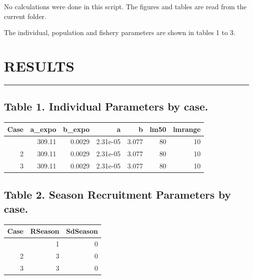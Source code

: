 \documentclass[
]{article}
\begin{document}
No calculations were done in this script. The figures and tables are
read from the current folder.

The individual, population and fishery parameters are shown in tables 1
to 3.

\hypertarget{section-1}{%
\subparagraph{}\label{section-1}}

\hypertarget{results}{%
\section{RESULTS}\label{results}}

\begin{center}\rule{0.5\linewidth}{0.5pt}\end{center}

\hypertarget{table-1.-individual-parameters-by-case.}{%
\subsection{Table 1. Individual Parameters by
case.}\label{table-1.-individual-parameters-by-case.}}

\begin{longtable}[]{@{}rrrrrrr@{}}
\toprule\noalign{}
Case & a\_expo & b\_expo & a & b & lm50 & lmrange \\
\midrule\noalign{}
\endhead
\bottomrule\noalign{}
\endlastfoot
1 & 309.11 & 0.0029 & 2.31e-05 & 3.077 & 80 & 10 \\
2 & 309.11 & 0.0029 & 2.31e-05 & 3.077 & 80 & 10 \\
3 & 309.11 & 0.0029 & 2.31e-05 & 3.077 & 80 & 10 \\
\end{longtable}

\hypertarget{table-2.-season-recruitment-parameters-by-case.}{%
\subsection{Table 2. Season Recruitment Parameters by
case.}\label{table-2.-season-recruitment-parameters-by-case.}}

\begin{longtable}[]{@{}rrr@{}}
\toprule\noalign{}
Case & RSeason & SdSeason \\
\midrule\noalign{}
\endhead
\bottomrule\noalign{}
\endlastfoot
1 & 1 & 0 \\
2 & 3 & 0 \\
3 & 3 & 0 \\
\end{longtable}
\end{document}
